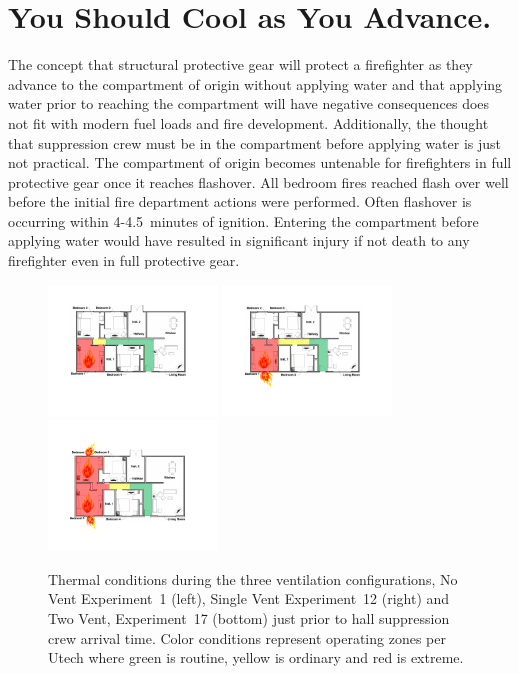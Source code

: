 \documentclass[12pt,oneside]{book}
\begin{document}
\section{You Should Cool as You Advance.} \label{tc:cool_as_you_advance}
The concept that structural protective gear will protect a firefighter as they advance to the compartment of origin without applying water and that applying water prior to reaching the compartment will have negative consequences does not fit with modern fuel loads and fire development. Additionally, the thought that suppression crew must be in the compartment before applying water is just not practical. The compartment of origin becomes untenable for firefighters in full protective gear once it reaches flashover. All bedroom fires reached flash over well before the initial fire department actions were performed. Often flashover is occurring within 4-4.5~minutes of ignition. Entering the compartment before applying water would have resulted in significant injury if not death to any firefighter even in full protective gear.

\begin{figure}[H]
\centering
\includegraphics[width=0.4\textwidth]{../0_Images/Tactical_Considerations/Cool_While_Advancing/No_Vent}
\includegraphics[width=0.4\textwidth]{../0_Images/Tactical_Considerations/Cool_While_Advancing/Single_Vent}
\includegraphics[width=0.4\textwidth]{../0_Images/Tactical_Considerations/Cool_While_Advancing/Two_Vent}
\caption[Thermal Conditions - Prior to Attack]{Thermal conditions during the three ventilation configurations, No Vent Experiment~1 (left), Single Vent Experiment~12 (right) and Two Vent, Experiment~17 (bottom) just prior to hall suppression crew arrival time. Color conditions represent operating zones per Utech \cite{Utech_Firefighter_Clothing} where green is routine, yellow is ordinary and red is extreme.}
\label{fig:Thermal_Classes_Approach_Delayed}
\end{figure}
\end{document}
